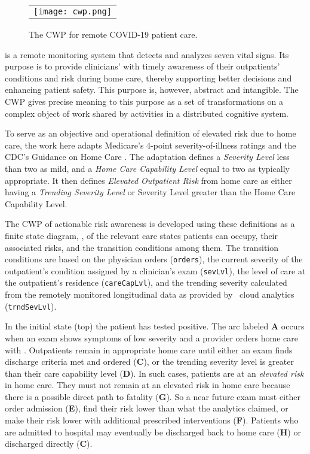 \begin{figure*}[t]
  \begin{center}
    \begin{tabular}{c}
      \texttt{[image: cwp.png]}
    \end{tabular}
  \end{center}
\caption{The CWP for remote COVID-19 patient care.}
\label{fig:cwp}
\end{figure*}

\phware is a remote monitoring system that detects and analyzes seven vital signs. Its purpose is to provide clinicians' with timely awareness of their outpatients' conditions and risk during home care, thereby supporting better decisions and enhancing patient safety. This purpose is, however, abstract and intangible. The CWP gives precise meaning to this purpose as a set of transformations on a complex object of work shared by activities in a distributed cognitive system.

To serve as an objective and operational definition of elevated risk due to home care, the work here adapts Medicare’s 4-point severity-of-illness ratings \cite{Hornbrook2005OverviewOD,severity} and the CDC’s Guidance on Home Care \cite{cdc}. The adaptation defines a \emph{Severity Level} less than two as mild, and a \emph{Home Care Capability Level} equal to two as typically appropriate. It then defines \emph{Elevated Outpatient Risk} from home care as either having a \emph{Trending Severity Level} or Severity Level greater than the Home Care Capability Level.

The CWP of actionable risk awareness is developed using these definitions as a finite state diagram, , of the relevant care states patients can occupy, their associated risks, and the transition conditions among them. The transition conditions are based on the physician orders (\texttt{orders}), the current severity of the outpatient’s condition assigned by a clinician’s exam (\texttt{sevLvl}), the level of care at the outpatient's residence (\texttt{careCapLvl}), and the trending severity calculated from the remotely monitored longitudinal data as provided by
\phware\ cloud analytics (\texttt{trndSevLvl}). 

In the initial state (top) the patient has tested positive. The arc labeled \textbf{A} occurs when an exam shows symptoms of low severity and a provider orders home care with \phware. Outpatients remain in appropriate home care until either an exam finds discharge criteria met and ordered (\textbf{C}), or the trending severity level is greater than their care capability level (\textbf{D}). In such cases, patients are at an \emph{elevated risk} in home care. They must not remain at an elevated risk in home care because there is a possible direct path to fatality (\textbf{G}). So a near future exam must either order admission (\textbf{E}), find their risk lower than what the analytics claimed, or make their risk lower with additional prescribed interventions (\textbf{F}). Patients who are admitted to hospital may eventually be discharged back to home care (\textbf{H}) or discharged directly (\textbf{C}). 

